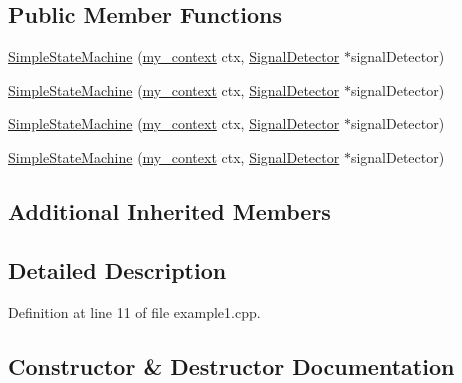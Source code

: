 \subsection*{Public Member Functions}
\begin{DoxyCompactItemize}
\item 
\hyperlink{structSimpleStateMachine_a66930f5ee365d71b115ef1e88da23a3e}{Simple\+State\+Machine} (\hyperlink{common_8h_af2dcacead80d69b96952496fe413bbfe}{my\+\_\+context} ctx, \hyperlink{classsmacc_1_1SignalDetector}{Signal\+Detector} $\ast$signal\+Detector)
\item 
\hyperlink{structSimpleStateMachine_a66930f5ee365d71b115ef1e88da23a3e}{Simple\+State\+Machine} (\hyperlink{common_8h_af2dcacead80d69b96952496fe413bbfe}{my\+\_\+context} ctx, \hyperlink{classsmacc_1_1SignalDetector}{Signal\+Detector} $\ast$signal\+Detector)
\item 
\hyperlink{structSimpleStateMachine_a66930f5ee365d71b115ef1e88da23a3e}{Simple\+State\+Machine} (\hyperlink{common_8h_af2dcacead80d69b96952496fe413bbfe}{my\+\_\+context} ctx, \hyperlink{classsmacc_1_1SignalDetector}{Signal\+Detector} $\ast$signal\+Detector)
\item 
\hyperlink{structSimpleStateMachine_a66930f5ee365d71b115ef1e88da23a3e}{Simple\+State\+Machine} (\hyperlink{common_8h_af2dcacead80d69b96952496fe413bbfe}{my\+\_\+context} ctx, \hyperlink{classsmacc_1_1SignalDetector}{Signal\+Detector} $\ast$signal\+Detector)
\end{DoxyCompactItemize}
\subsection*{Additional Inherited Members}


\subsection{Detailed Description}


Definition at line 11 of file example1.\+cpp.



\subsection{Constructor \& Destructor Documentation}
